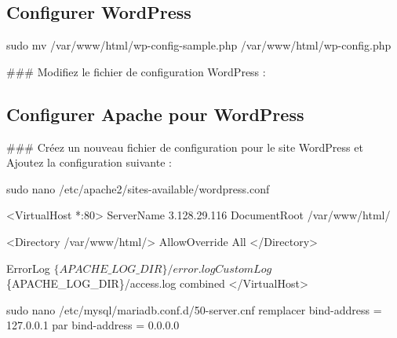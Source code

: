 \subsection*{Configurer Word\+Press}


\begin{DoxyCode}
sudo mv /var/www/html/wp-config-sample.php /var/www/html/wp-config.php
\end{DoxyCode}


\#\#\# Modifiez le fichier de configuration Word\+Press \+: 


\subsection*{Configurer Apache pour Word\+Press}

\#\#\# Créez un nouveau fichier de configuration pour le site Word\+Press et Ajoutez la configuration suivante \+: 
\begin{DoxyCode}
sudo nano /etc/apache2/sites-available/wordpress.conf

<VirtualHost *:80>
    ServerName 3.128.29.116
    DocumentRoot /var/www/html/

    <Directory /var/www/html/>
        AllowOverride All
    </Directory>

    ErrorLog $\{APACHE\_LOG\_DIR\}/error.log
    CustomLog $\{APACHE\_LOG\_DIR\}/access.log combined
</VirtualHost>
\end{DoxyCode}



\begin{DoxyCode}
sudo nano /etc/mysql/mariadb.conf.d/50-server.cnf
remplacer
bind-address            = 127.0.0.1
par
bind-address            = 0.0.0.0
\end{DoxyCode}


